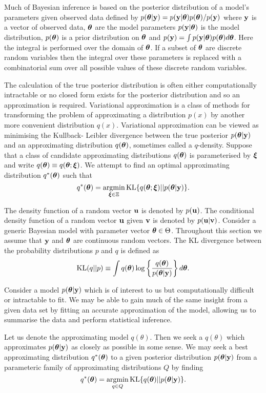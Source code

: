 Much of Bayesian inference is based on the posterior distribution of a model's parameters given observed data 
defined by $p({\boldsymbol \theta}|{\bf y}) = p({\bf y}|{\boldsymbol \theta})p({\boldsymbol \theta})/p({\bf y})$ where ${\bf y}$ is a vector of observed data,
${\boldsymbol \theta}$ are the model parameters $p({\bf y}|{\boldsymbol \theta})$ is the model distribution, $p({\boldsymbol \theta})$ is a prior 
distribution on ${\boldsymbol \theta}$ and $p({\bf y})=\int p({\bf y}|{\boldsymbol \theta})p({\boldsymbol \theta})d{\boldsymbol \theta}$. Here the integral is performed
over the domain of ${\boldsymbol \theta}$. If a subset of ${\boldsymbol \theta}$ are discrete random variables then the integral over
these parameters is replaced with a combinatorial sum over all possible values of these discrete random 
variables.

The calculation of the true posterior distribution is often either computationally intractable or no closed form
exists for the posterior distribution and so an approximation is required. Variational approximation is a
class of methods for transforming the problem of approximating a distribution $p(x)$ by another more
convenient distribution $q(x)$. Variational approximation can be viewed as minimising the Kullback- Leibler
divergence between the true posterior $p({\boldsymbol \theta}|{\bf y})$ and an approximating distribution $q({\boldsymbol \theta})$,
sometimes called a $q$-density. Suppose that a class of candidate approximating distributions
$q({\boldsymbol \theta})$ is parameterised by ${\boldsymbol \xi}$ and write $q({\boldsymbol \theta})\equiv q({\boldsymbol \theta};{\boldsymbol \xi})$. We attempt to find an 
optimal approximating distribution $q^*({\boldsymbol \theta})$ such that
\[
	\ds q^*(\vtheta) = \argmin_{\vxi \in \Xi} \text{KL} \{ {q(\vtheta;\vxi) || p(\vtheta|\vy)} \}.
\]

The density function of a random vector ${\bf u}$ is denoted by $p({\bf u})$.  The conditional density function of a
random vector ${\bf u}$ given ${\bf v}$ is denoted by $p({\bf u}|{\bf v})$. Consider a generic Bayesian model with parameter
vector ${\boldsymbol \theta} \in \Theta$. Throughout this section we assume that ${\bf y}$ and ${\boldsymbol \theta}$ are continuous random
vectors. The KL divergence between the probability distributions $p$ and $q$ is defined as
\[
	\text{KL}(q || p) \equiv \int q({\boldsymbol \theta}) \log \left \{ \frac{q({\boldsymbol \theta})}{p({\boldsymbol \theta} | {\bf y})} \right \} d {\boldsymbol \theta}.
\]

Consider a model $p({\boldsymbol \theta}|{\bf y})$ which is of interest to us but computationally difficult or intractable to 
fit. We may be able to gain much of the same insight from a given data set by fitting an accurate approximation 
of the model, allowing us to summarise the data and perform statistical inference.

Let us denote the approximating model $q(\theta)$. Then we seek a $q(\theta)$ which approximates
$p({\boldsymbol \theta}|{\bf y})$ as closely as possible in some sense. 
We may seek a best approximating distribution $q^*({\boldsymbol \theta})$ to a given posterior distribution
$p({\boldsymbol \theta}|{\bf y})$ from a parameteric family of approximating distributions $Q$ by finding
\[
	q^*(\vtheta) = \argmin_{q \in Q} \KL \{ {q(\vtheta) || p(\vtheta|\vy)} \}.
\]

